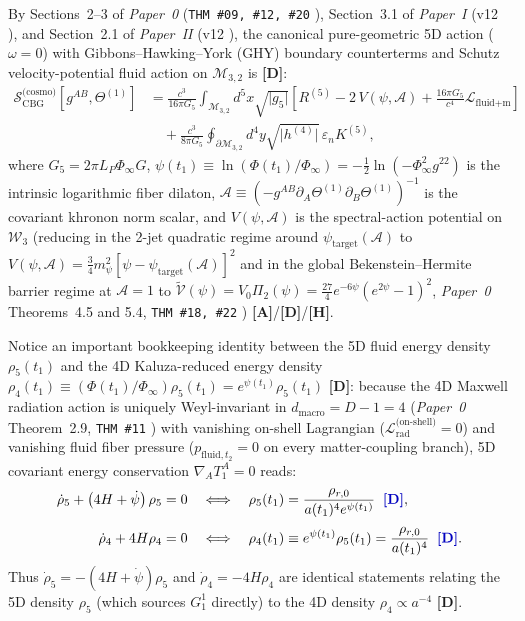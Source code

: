 \documentclass[11pt,a4paper]{article}
\newcommand{\catA}{\textbf{\textcolor{purple!80!black}{[A]}}}
\newcommand{\catD}{\textbf{\textcolor{blue!75!black}{[D]}}}
\newcommand{\catH}{\textbf{\textcolor{orange!85!black}{[H]}}}
\theoremstyle{plain}
\theoremstyle{definition}
\theoremstyle{remark}
\numberwithin{equation}{section}
\begin{document}
By Sections~2--3 of \textit{Paper~0} (\texttt{THM \#09, \#12, \#20} \cite{jimenez2026_p0}), Section~3.1 of \textit{Paper~I} (v12 \cite{jimenez2026a}), and Section~2.1 of \textit{Paper~II} (v12 \cite{jimenez2026b}), the canonical pure-geometric 5D action ($\omega = 0$) with Gibbons--Hawking--York (GHY) boundary counterterms \cite{york1972,gibbons1977} and Schutz velocity-potential fluid action \cite{schutz1970} on $\mathcal{M}_{3,2}$ is \catD:
\begin{align}
\mathcal{S}_{\text{CBG}}^{\text{(cosmo)}}\!\left[g^{AB}, \Theta^{(1)}\right] &= \frac{c^3}{16\pi G_5} \int_{\mathcal{M}_{3,2}} d^5x \sqrt{\lvert g_5 \rvert} \left[ R^{(5)} - 2\,V\!\left(\psi, \mathcal{A}\right) + \frac{16\pi G_5}{c^4}\mathcal{L}_{\text{fluid+m}} \right] \nonumber \\[3pt]
&\quad + \frac{c^3}{8\pi G_5} \oint_{\partial\mathcal{M}_{3,2}} d^4y \sqrt{\lvert h^{(4)} \rvert}\,\varepsilon_n K^{(5)},
\label{eq:master_cosmo_action}
\end{align}
where $G_5 = 2\pi L_P\Phi_{\infty} G$, $\psi(t_1) \equiv \ln(\Phi(t_1)/\Phi_{\infty}) = -\frac{1}{2}\ln(-\Phi_{\infty}^2 g^{22})$ is the intrinsic logarithmic fiber dilaton, $\mathcal{A} \equiv (-g^{AB}\partial_A\Theta^{(1)}\partial_B\Theta^{(1)})^{-1}$ is the covariant khronon norm scalar, and $V(\psi, \mathcal{A})$ is the spectral-action potential on $\mathcal{W}_3$ (reducing in the 2-jet quadratic regime around $\psi_{\text{target}}(\mathcal{A})$ to $V(\psi, \mathcal{A}) = \frac{3}{4}m_{\psi}^2[\psi - \psi_{\text{target}}(\mathcal{A})]^2$ and in the global Bekenstein--Hermite barrier regime at $\mathcal{A} = 1$ to $\widetilde{\mathcal{V}}(\psi) = V_0\Pi_2(\psi) = \frac{27}{4}e^{-6\psi}(e^{2\psi}-1)^2$, \textit{Paper~0} Theorems~4.5 and 5.4, \texttt{THM \#18, \#22} \cite{jimenez2026_p0}) \catA/\catD/\catH.

Notice an important bookkeeping identity between the 5D fluid energy density $\rho_5(t_1)$ and the 4D Kaluza-reduced energy density $\rho_4(t_1) \equiv (\Phi(t_1)/\Phi_{\infty})\rho_5(t_1) = e^{\psi(t_1)}\rho_5(t_1)$ \catD: because the 4D Maxwell radiation action is uniquely Weyl-invariant in $d_{\text{macro}} = D - 1 = 4$ (\textit{Paper~0} Theorem~2.9, \texttt{THM \#11} \cite{jimenez2026_p0}) with vanishing on-shell Lagrangian ($\mathcal{L}_{\text{rad}}^{\text{(on-shell)}} = 0$) and vanishing fluid fiber pressure ($p_{\text{fluid},t_2} = 0$ on every matter-coupling branch), 5D covariant energy conservation $\nabla_A T^A_1 = 0$ reads:
\begin{align}
  \dot{\rho}_5 + \left(4H + \dot{\psi}\right)\rho_5 = 0 \quad &\Longleftrightarrow \quad \rho_5(t_1) = \frac{\rho_{r,0}}{a(t_1)^4 e^{\psi(t_1)}} \;\;\catD, \nonumber \\[3pt]
  \dot{\rho}_4 + 4H\rho_4 = 0 \quad &\Longleftrightarrow \quad \rho_4(t_1) \equiv e^{\psi(t_1)}\rho_5(t_1) = \frac{\rho_{r,0}}{a(t_1)^4} \;\;\catD.
  \label{eq:5d_vs_4d_radiation_bookkeeping}
\end{align}
Thus $\dot{\rho}_5 = -(4H + \dot{\psi})\rho_5$ and $\dot{\rho}_4 = -4H\rho_4$ are identical statements relating the 5D density $\rho_5$ (which sources $G^1_1$ directly) to the 4D density $\rho_4 \propto a^{-4}$ \catD.
\end{document}

